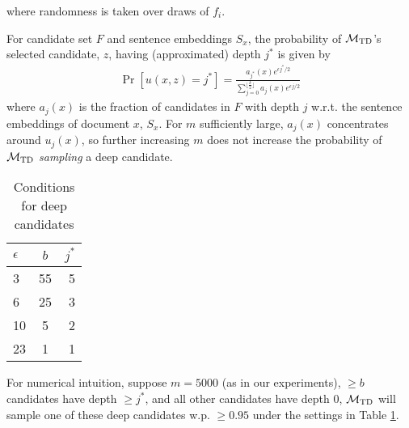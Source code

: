 \noindent where randomness is taken over draws of $f_i$. 

For candidate set $F$ and sentence embeddings $S_x$, the probability of $\mathcal{M}_{\text{TD}}$'s selected candidate, $z$, having (approximated) depth $j^*$ is given by 
\begin{align}
	\Pr[u(x, z) = j^*] = \frac{a_{j^*}(x)e^{\epsilon j^* / 2}}{\sum_{j=0}^{\lfloor \frac{k}{2} \rfloor} a_j(x) e^{\epsilon j / 2}}
	\label{eqn:prob deep}
\end{align}
where $a_j(x)$ is the fraction of candidates in $F$ with depth $j$ w.r.t. the sentence embeddings of document $x$, $S_x$. For $m$ sufficiently large, $a_j(x)$ concentrates around $u_j(x)$, so further increasing $m$ 
does not increase the probability of $\mathcal{M}_{\text{TD}}$ \emph{sampling} a deep candidate. 

\begin{table}[h!]
  \begin{center}
  \vspace{-0.25cm}
    \caption{Conditions for deep candidates}
    \label{tab:mech example}
    \begin{tabular}{l|c|r} %
      $\epsilon$ & $b$ & $j^*$ \\
      \hline
      3 & 55 & 5\\
      6 & 25 & 3\\
      10 & 5 & 2\\
      23 & 1 & 1\\
    \end{tabular}
  \end{center}
  \vspace{-0.5cm}
\end{table}

For numerical intuition, suppose $m = 5000$ (as in our experiments), $\geq b$ candidates have depth $\geq j^*$, and all other candidates have depth 0, $\mathcal{M}_{\text{TD}}$ will sample one of these deep candidates w.p. $\geq 0.95$ under the settings in Table \ref{tab:mech example}. 

